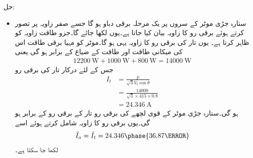 حل:
\begin{itemize}
\item
ستارہ جڑی موٹر کے سروں پر یک مرحلہ برقی دباو   ہو گا جسے صفر زاویہ پر تصور کرتے ہوئے برقی رو کا زاویہ بیان کیا جاتا ہے۔یوں  لکھا جائے گا۔جزو طاقت  زاویہ   کو ظاہر کرتا ہے۔ یوں تار کی برقی رو کا  زاویہ یہی ہو گا۔موٹر کو مہیا برقی طاقت اس کی میکانی طاقت اور طاقت کے ضیاع کے برابر ہو گی یعنی
\begin{align*}
\SI{12200}{\watt}+\SI{1000}{\watt}+\SI{800}{\watt}=\SI{14000}{\watt}
\end{align*}
جس  کے لئے درکار تار کی برقی رو 
\begin{align*}
I_t&=\frac{p}{\sqrt{3} V_{t} \cos \theta}\\
&=\frac{\num{14000}}{\sqrt{3} \times 415 \times 0.8}\\
&=\SI{24.346}{\ampere}
\end{align*}
ہو گی۔ستارہ جڑی موٹر کے قوی لچھے کی برقی رو تار کے برقی رو کے برابر ہو گی۔یوں برقی رو کا زاویہ شامل کرتے ہوئے اسے 
\begin{align*}
\hat{I}_a=\hat{I}_t=24.346 \phase {36.87 \degree}
\end{align*}
لکھا جا سکتا ہے۔


\end{itemize}
